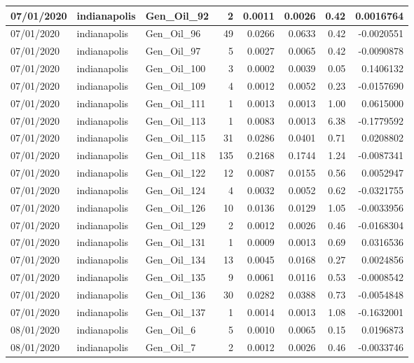 \documentclass[
  letterpaper,
  DIV=11,
  numbers=noendperiod]{scrartcl}
\begin{document}
\begin{tabular}{l|l|l|r|r|r|r|r}
\hline
07/01/2020 & indianapolis & Gen\_Oil\_92 & 2 & 0.0011 & 0.0026 & 0.42 & 0.0016764\\
\hline
07/01/2020 & indianapolis & Gen\_Oil\_96 & 49 & 0.0266 & 0.0633 & 0.42 & -0.0020551\\
\hline
07/01/2020 & indianapolis & Gen\_Oil\_97 & 5 & 0.0027 & 0.0065 & 0.42 & -0.0090878\\
\hline
07/01/2020 & indianapolis & Gen\_Oil\_100 & 3 & 0.0002 & 0.0039 & 0.05 & 0.1406132\\
\hline
07/01/2020 & indianapolis & Gen\_Oil\_109 & 4 & 0.0012 & 0.0052 & 0.23 & -0.0157690\\
\hline
07/01/2020 & indianapolis & Gen\_Oil\_111 & 1 & 0.0013 & 0.0013 & 1.00 & 0.0615000\\
\hline
07/01/2020 & indianapolis & Gen\_Oil\_113 & 1 & 0.0083 & 0.0013 & 6.38 & -0.1779592\\
\hline
07/01/2020 & indianapolis & Gen\_Oil\_115 & 31 & 0.0286 & 0.0401 & 0.71 & 0.0208802\\
\hline
07/01/2020 & indianapolis & Gen\_Oil\_118 & 135 & 0.2168 & 0.1744 & 1.24 & -0.0087341\\
\hline
07/01/2020 & indianapolis & Gen\_Oil\_122 & 12 & 0.0087 & 0.0155 & 0.56 & 0.0052947\\
\hline
07/01/2020 & indianapolis & Gen\_Oil\_124 & 4 & 0.0032 & 0.0052 & 0.62 & -0.0321755\\
\hline
07/01/2020 & indianapolis & Gen\_Oil\_126 & 10 & 0.0136 & 0.0129 & 1.05 & -0.0033956\\
\hline
07/01/2020 & indianapolis & Gen\_Oil\_129 & 2 & 0.0012 & 0.0026 & 0.46 & -0.0168304\\
\hline
07/01/2020 & indianapolis & Gen\_Oil\_131 & 1 & 0.0009 & 0.0013 & 0.69 & 0.0316536\\
\hline
07/01/2020 & indianapolis & Gen\_Oil\_134 & 13 & 0.0045 & 0.0168 & 0.27 & 0.0024856\\
\hline
07/01/2020 & indianapolis & Gen\_Oil\_135 & 9 & 0.0061 & 0.0116 & 0.53 & -0.0008542\\
\hline
07/01/2020 & indianapolis & Gen\_Oil\_136 & 30 & 0.0282 & 0.0388 & 0.73 & -0.0054848\\
\hline
07/01/2020 & indianapolis & Gen\_Oil\_137 & 1 & 0.0014 & 0.0013 & 1.08 & -0.1632001\\
\hline
08/01/2020 & indianapolis & Gen\_Oil\_6 & 5 & 0.0010 & 0.0065 & 0.15 & 0.0196873\\
\hline
08/01/2020 & indianapolis & Gen\_Oil\_7 & 2 & 0.0012 & 0.0026 & 0.46 & -0.0033746\\

\end{tabular}
\end{document}
